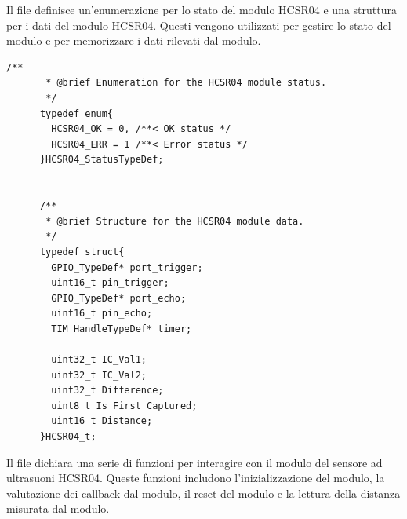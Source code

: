\documentclass{article}
\begin{document}
      Il file definisce un'enumerazione per lo stato del modulo HCSR04 e una struttura per i dati del modulo HCSR04. Questi vengono utilizzati per gestire lo stato del modulo e per memorizzare i dati rilevati dal modulo.
      
      \begin{lstlisting}[style=CStyle]
      /**
       * @brief Enumeration for the HCSR04 module status.
       */
      typedef enum{
        HCSR04_OK = 0, /**< OK status */
        HCSR04_ERR = 1 /**< Error status */
      }HCSR04_StatusTypeDef;
      
      
      /**
       * @brief Structure for the HCSR04 module data.
       */
      typedef struct{
        GPIO_TypeDef* port_trigger;
        uint16_t pin_trigger;
        GPIO_TypeDef* port_echo;
        uint16_t pin_echo;
        TIM_HandleTypeDef* timer;
      
        uint32_t IC_Val1;
        uint32_t IC_Val2;
        uint32_t Difference;
        uint8_t Is_First_Captured;
        uint16_t Distance;
      }HCSR04_t;
      \end{lstlisting}
      
      Il file dichiara una serie di funzioni per interagire con il modulo del sensore ad ultrasuoni HCSR04. Queste funzioni includono l'inizializzazione del modulo, la valutazione dei callback dal modulo, il reset del modulo e la lettura della distanza misurata dal modulo.
      
\end{document}
